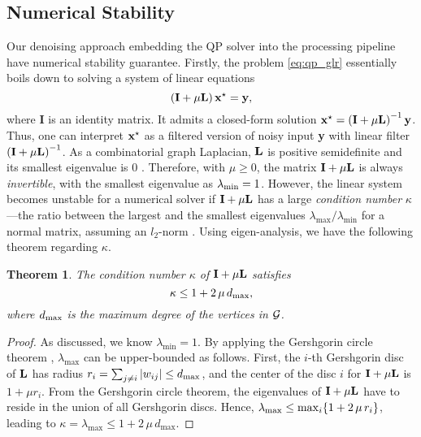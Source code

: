 \documentclass[10pt,twocolumn,letterpaper]{article}
\newtheorem{theorem}{Theorem}
\begin{document}
\subsection{Numerical Stability}
\label{ssec:glr_loss}
%
Our denoising approach embedding the QP solver into the processing pipeline have numerical stability guarantee.
Firstly, the problem \eqref{eq:qp_glr} essentially boils down to solving a system of linear equations
%
\begin{equation}\label{eq:qp_system}
\left({\bf I}+\mu{\bf L}\right){\bf x}^{\star}={\bf y},
\end{equation}
%
where {\bf I} is an identity matrix. 
It admits a closed-form solution ${\bf x}^{\star} = \left({\bf I} + \mu{\bf L}\right)^{-1}{\bf y}$. 
Thus, one can interpret ${\bf x}^{\star}$ as a filtered version of noisy input {\bf y} with linear filter $\left({\bf I} + \mu{\bf L}\right)^{-1}$. 
As a combinatorial graph Laplacian, ${\bf L}$ is positive semidefinite and its smallest eigenvalue is 0 \cite{shuman2013emerging}.
Therefore, with $\mu \ge 0$, the matrix ${\bf I} + \mu{\bf L}$ is always \emph{invertible}, with the smallest eigenvalue as $\lambda_{\rm min}=1$. 
However, the linear system becomes unstable for a numerical solver if ${\bf I} + \mu{\bf L}$ has a large \textit{condition number} $\kappa$---the ratio between the largest and the smallest eigenvalues $\lambda_{\max} / \lambda_{\min}$ for a normal matrix, assuming an $l_2$-norm \cite{horn1990matrix}. 
Using eigen-analysis, we have the following theorem regarding $\kappa$.
%
\begin{theorem}\label{thm:cond}
The condition number $\kappa$ of ${\bf I} + \mu{\bf L}$ satisfies
%
\begin{equation}
\kappa \le 1 + 2 \, \mu \, d_{\rm max}, 
\end{equation}
%
where $d_{\rm max}$ is the maximum degree of the vertices in ${\cal G}$.
\end{theorem}
%
\begin{proof}
As discussed, we know $\lambda_{\min}=1$. 
By applying the Gershgorin circle theorem \cite{varga2010gervsgorin}, $\lambda_{\max}$ can be upper-bounded as follows. 
First, the $i$-th Gershgorin disc of $\bf{L}$ has radius $r_i = \sum\nolimits_{j \neq i} |w_{ij}| \le d_{\rm max}$, and the center of the disc $i$ for ${\bf I} + \mu{\bf L}$ is $1+\mu r_i$. 
From the Gershgorin circle theorem, the eigenvalues of ${\bf I} + \mu{\bf L}$ have to reside in the union of all Gershgorin discs. 
Hence, $\lambda_{\rm max} \le \max_{i} \{1 + 2 \, \mu \, r_i\}$, leading to $\kappa = \lambda_{\max} \le 1 + 2 \, \mu \, d_{\max}$.
\end{proof}
\end{document}
